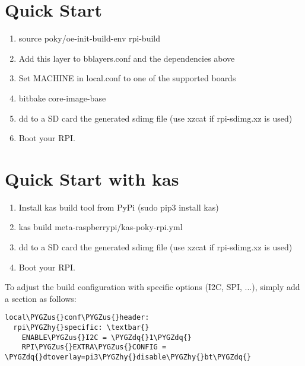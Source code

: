 \documentclass[letterpaper,10pt,english]{sphinxmanual}
\def\PYGZus{\char`\_}
\def\PYGZhy{\char`\-}
\def\PYGZdq{\char`\"}
\begin{document}
\section{Quick Start}
\label{readme:quick-start}\begin{enumerate}
\item {} 
source poky/oe-init-build-env rpi-build

\item {} 
Add this layer to bblayers.conf and the dependencies above

\item {} 
Set MACHINE in local.conf to one of the supported boards

\item {} 
bitbake core-image-base

\item {} 
dd to a SD card the generated sdimg file (use xzcat if rpi-sdimg.xz is used)

\item {} 
Boot your RPI.

\end{enumerate}


\section{Quick Start with kas}
\label{readme:quick-start-with-kas}\begin{enumerate}
\item {} 
Install kas build tool from PyPi (sudo pip3 install kas)

\item {} 
kas build meta-raspberrypi/kas-poky-rpi.yml

\item {} 
dd to a SD card the generated sdimg file (use xzcat if rpi-sdimg.xz is used)

\item {} 
Boot your RPI.

\end{enumerate}

To adjust the build configuration with specific options (I2C, SPI, ...), simply add
a section as follows:

\begin{Verbatim}[commandchars=\\\{\}]
local\PYGZus{}conf\PYGZus{}header:
  rpi\PYGZhy{}specific: \textbar{}
    ENABLE\PYGZus{}I2C = \PYGZdq{}1\PYGZdq{}
    RPI\PYGZus{}EXTRA\PYGZus{}CONFIG = \PYGZdq{}dtoverlay=pi3\PYGZhy{}disable\PYGZhy{}bt\PYGZdq{}
\end{Verbatim}
\end{document}
